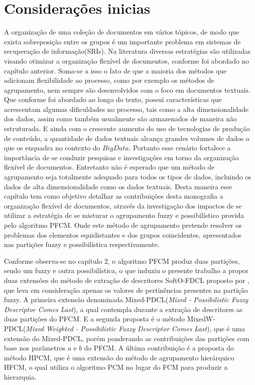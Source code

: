 \section{Considerações inicias}
A organização de uma coleção de documentos em vários tópicos, de modo que exista sobreposição
entre os grupos é um importante problema em sistemas de recuperação de informação(SRIs). Na
literatura diversas estratégias são utilizadas visando otimizar a organização flexível de
documentos, conforme foi abordado no capítulo anterior. Soma-se a isso o fato de que a maioria dos
métodos que adicionam flexibilidade ao processo, como por exemplo  os métodos de agrupamento, nem
sempre são desenvolvidos com o foco em documentos textuais. Que conforme foi abordado ao longo do
texto, possui características que acrescentam algumas dificuldades no processo, tais como a alta
dimensionalidade dos dados, assim como também usualmente são armazenados de maneira não estruturada.
E ainda com o crescente aumento do uso de tecnologias de produção de conteúdo, a quantidade de dados
textuais alcança grandes volumes de dados o que os enquadra no contexto do $Big Data$. 
Portanto esse cenário fortalece a importância de se conduzir pesquisas e investigações em torno da
organização flexível de documentos. Entretanto não é esperado que um método de agrupamento seja
totalmente adequado para todos os tipos de dados, incluindo os dados de alta dimensionalidade como
os dados textuais\cite{Steinbach2004}. Desta maneira esse capítulo tem como objetivo detalhar as 
contribuições
desta monografia a organização flexível de documentos, através da investigação dos impactos de se
utilizar a estratégia de se misturar o agrupamento fuzzy e possibilístico provida pelo algoritmo
PFCM. Onde este método de agrupamento pretende resolver os problemas dos elementos equidistantes e 
dos grupos
coincidentes, apresentados nas partições fuzzy e possibilística respectivamente. 

Conforme observa-se no capítulo 2, o algoritmo PFCM produz duas
partições, sendo um fuzzy e outra possibilística, o que induziu o presente trabalho a propor duas extensões do
método de extração de descritores SoftO-FDCL proposto por \cite{Nogueira2013}, que leva em
consideração apenas os valores de pertinências presentes na partição fuzzy. A primeira extensão
denominada Mixed-PDCL({\it Mixed - Possibilistic Fuzzy Descriptor Comes Last\/}), 
a qual contempla durante a extração de descritores as duas partições do PFCM.
E a segunda proposta é o método 
MixedW-PDCL({\it Mixed Weighted - Possibilistic Fuzzy Descriptor Comes Last\/}), 
que é uma extensão do Mixed-PDCL, porém ponderando as
contribuições das partições com base nos parâmetros $a$ e $b$ do PFCM. A última contribuição é a
proposta do método HPCM, que é uma extensão do método de agrupamento hierárquico HFCM, o qual
utiliza o algoritmo PCM no lugar do FCM para produzir a hierarquia.

